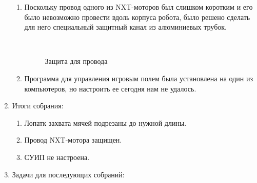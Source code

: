 \begin{enumerate}
\begin{enumerate}
		\item Поскольку провод одного из NXT-моторов был слишком коротким и его было невозможно провести вдоль корпуса робота, было решено сделать для него специальный защитный канал из алюминиевых трубок.
		\begin{figure}[H]
			\begin{minipage}[h]{0.2\linewidth}
				\center  
			\end{minipage}
			\begin{minipage}[h]{0.6\linewidth}
				\caption{Защита для провода}
			\end{minipage}
		\end{figure}
		
        \item Программа для управления игровым полем была установлена на один из компьютеров, но настроить ее сегодня нам не удалось.

	\end{enumerate}
	
	\item Итоги собрания:
	\begin{enumerate}
		
		\item Лопатк захвата мячей подрезаны до нужной длины.
		
		\item Провод NXT-мотора защищен.
		
        \item СУИП не настроена.
		
	\end{enumerate}
	
	\item Задачи для последующих собраний:
	\begin{enumerate}
		

\end{enumerate}
\end{enumerate}
